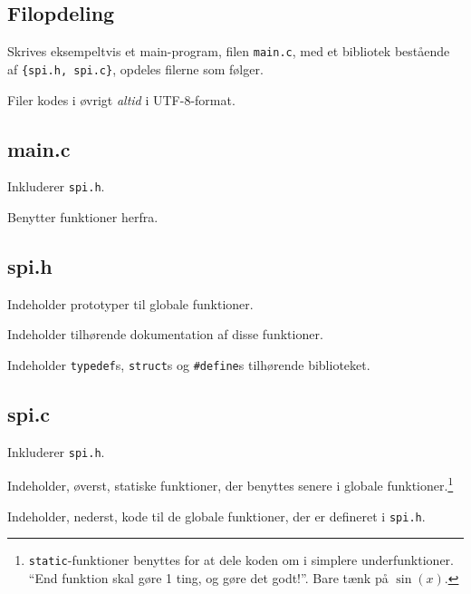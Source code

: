 \documentclass[article, 10pt]{memoir}
\let\tempone\itemize
\let\temptwo\enditemize
\renewenvironment{itemize}{\tempone\firmlist}{\temptwo}
\begin{document}
\begin{multicols}{2}
    \chapter{Filopdeling}
    Skrives eksempeltvis et main-program, filen \texttt{main.c}, med et bibliotek bestående af \texttt{\{spi.h, spi.c\}}, opdeles filerne som følger. 

    Filer kodes i øvrigt \emph{altid} i UTF-8-format.

    \section{main.c}
    \begin{itemize}
        \item Inkluderer \texttt{spi.h}.
        \item Benytter funktioner herfra.
    \end{itemize}

    \section{spi.h}
    \begin{itemize}
        \item Indeholder prototyper til globale funktioner.
        \item Indeholder tilhørende dokumentation af disse funktioner.
        \item Indeholder \texttt{typedef}s, \texttt{struct}s og \texttt{\#define}s tilhørende biblioteket.
    \end{itemize}

    \section{spi.c}
    \begin{itemize}
        \item Inkluderer \texttt{spi.h}.
        \item Indeholder, øverst, statiske funktioner, der benyttes senere i globale funktioner.\footnote{\texttt{static}-funktioner benyttes for at dele koden om i simplere underfunktioner. ``End funktion skal gøre 1 ting, og gøre det godt!''. Bare tænk på $\sin(x)$.}
        \item Indeholder, nederst, kode til de globale funktioner, der er defineret i \texttt{spi.h}.
    \end{itemize}
\end{multicols}
\end{document}

